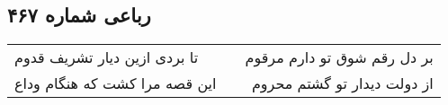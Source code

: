 \begin{center}
\section*{رباعی شماره ۴۶۷}
\label{sec:sh467}
\begin{longtable}{l p{0.5cm} r}
تا بردی ازین دیار تشریف قدوم
&&
بر دل رقم شوق تو دارم مرقوم
\\
این قصه مرا کشت که هنگام وداع
&&
از دولت دیدار تو گشتم محروم
\\
\end{longtable}
\end{center}

